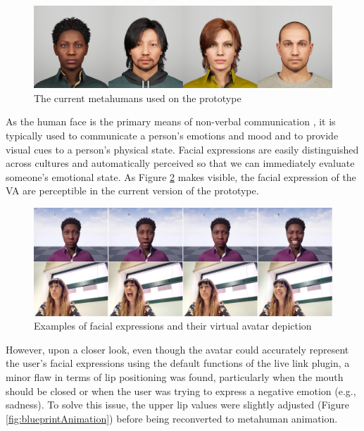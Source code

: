 \begin{figure}[!htb]
\includegraphics[width=\textwidth]{figures/4metahumans.jpg}
\centering
\caption{The current metahumans used on the prototype}
\label{fig:metahumans}
\end{figure}

As the human face is the primary means of non-verbal communication \cite{MALO20, KUJ03, SAU19}, it is typically used to communicate a person's emotions and mood and to provide visual cues to a person's physical state. Facial expressions are easily distinguished across cultures and automatically perceived so that we can immediately evaluate someone's emotional state. As Figure \ref{fig:metahumanFacialExpressions} makes visible, the facial expression of the VA are perceptible in the current version of the prototype. 

\begin{figure}[!htb]
\includegraphics[width=\textwidth]{figures/expressionTest.jpg}
\centering
\caption{Examples of facial expressions and their virtual avatar depiction}
\label{fig:metahumanFacialExpressions}
\end{figure}

However, upon a closer look, even though the avatar could accurately represent the user's facial expressions using the default functions of the live link plugin, a minor flaw in terms of lip positioning was found, particularly when the mouth should be closed or when the user was trying to express a negative emotion (e.g., sadness). To solve this issue, the upper lip values were slightly adjusted (Figure \ref{fig:blueprintAnimation}) before being reconverted to metahuman animation.

